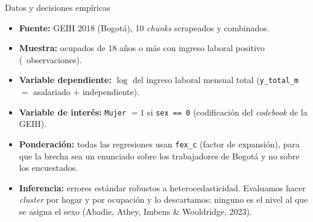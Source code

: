 \documentclass[aspectratio=169]{beamer}
\begin{document}
\begin{frame}{Datos y decisiones empíricas}
  \begin{itemize}
    \item \textbf{Fuente:} GEIH 2018 (Bogotá), 10 \emph{chunks} scrapeados y combinados.
    \item \textbf{Muestra:} ocupados de 18 años o más con ingreso laboral positivo
      (\GapNobs\ observaciones).
    \item \textbf{Variable dependiente:} $\log$ del ingreso laboral mensual total
      (\texttt{y\_total\_m} $=$ asalariado $+$ independiente).
    \item \textbf{Variable de interés:} \texttt{Mujer} $=1$ si \texttt{sex == 0}
      (codificación del \emph{codebook} de la GEIH).
    \item \textbf{Ponderación:} todas las regresiones usan \texttt{fex\_c}
      (factor de expansión), para que la brecha sea un enunciado sobre los
      trabajadores de Bogotá y no sobre los encuestados.
    \item \textbf{Inferencia:} errores estándar robustos a heterocedasticidad.
      Evaluamos hacer \emph{cluster} por hogar y por ocupación y lo descartamos:
      ninguno es el nivel al que se asigna el sexo (Abadie, Athey, Imbens \&
      Wooldridge, 2023).
  \end{itemize}
\end{frame}
\end{document}
